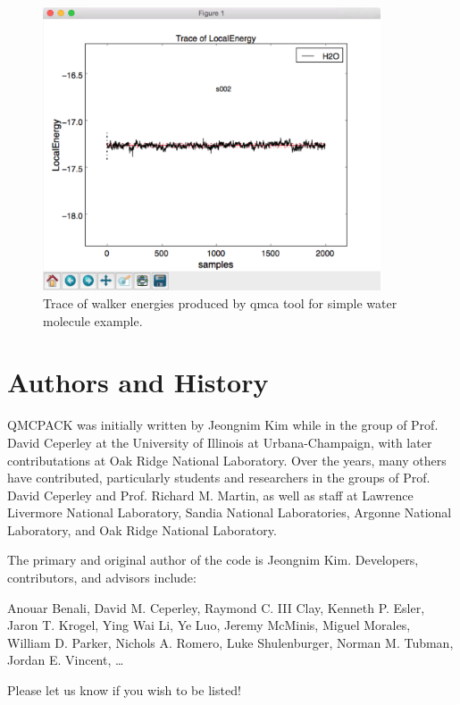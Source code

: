 \begin{figure}
  \centering
  \includegraphics[width=10cm]{figures/quick_qmca_dmc_trace.png}
  \caption{Trace of walker energies produced by qmca tool for simple
    water molecule example.}
  \label{fig:quick_qmca_dmc_trace}
\end{figure}

\section{Authors and History}
\label{sec:history}
QMCPACK was initially written by Jeongnim Kim while in the group of
Prof. David Ceperley at the University of Illinois at
Urbana-Champaign, with later contributations at Oak Ridge National Laboratory. Over the years, many others have contributed, particularly
students and researchers in the groups of Prof. David Ceperley
and Prof. Richard M. Martin, as well as staff at Lawrence Livermore
National Laboratory, Sandia National Laboratories, Argonne National
Laboratory, and Oak Ridge National Laboratory.

The primary and original author of the code is Jeongnim
Kim. Developers, contributors, and advisors include:

Anouar Benali,  
David M. Ceperley, 
Raymond C. III Clay,
Kenneth P. Esler,
Jaron T. Krogel,
Ying Wai Li,
Ye Luo,
Jeremy McMinis,
Miguel Morales,
William D. Parker,
Nichols A. Romero,
Luke Shulenburger,
Norman M. Tubman,
Jordan E. Vincent,
\ldots

Please let us know if you wish to be listed!

